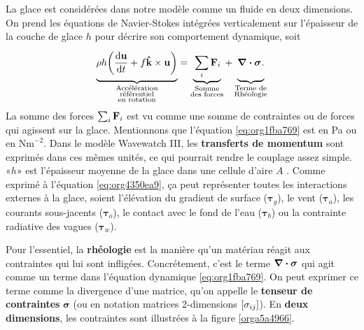 \documentclass[10pt]{article}
\numberwithin{equation}{section}
\newcommand{\kvf}{\vb{\hat{k}}}
\newcommand{\uu}{\vb{u}}
\newcommand{\venti}{\vphantom{\sum_x^x}}
\begin{document}
La glace est considérées dans notre modèle comme un fluide en deux dimensions.
On prend les équations de Navier-Stokes intégrées verticalement sur l'épaisseur de la couche de glace \(h\) pour décrire son comportement dynamique, soit
\begin{equation}
\label{eq:org1fba769}
    \underbrace{\venti\rho h\qty(\dv{\uu}{t} + f\kvf\times\uu)}_{\substack{\text{Accélération}\\\text{référentiel}\\\text{en rotation}}}
   =\underbrace{\venti\sum_i\vb{F}_i}_{\substack{\text{Somme}\\\text{des forces}}}
   +\underbrace{\venti\divergence{\boldsymbol{\sigma}}.}_{\substack{\text{Terme de}\\\text{Rhéologie}}}
\end{equation}
La somme des forces \(\sum_i \vb{F}_i\) est vu comme une somme de contraintes ou de forces qui agissent sur la glace.
Mentionnons que l'équation \ref{eq:org1fba769} est en Pa ou en \(\text{Nm}^{-2}\).
Dans le modèle Wavewatch III, les \textbf{transferts de momentum} sont exprimés dans ces mêmes unités, ce qui pourrait rendre le couplage assez simple.
«\(h\)» est l'épaisseur moyenne de la glace dans une cellule d'aire \(A\) \autocite[voir][pour un aperçu]{dumont2022marginal}. 
Comme exprimé à l'équation \ref{eq:org4350ea9}, ça peut représenter toutes les interactions externes à la glace, soient l'élévation du gradient de surface (\(\boldsymbol{\tau}_g\)), le vent (\(\boldsymbol{\tau}_a\)), les courants sous-jacents (\(\boldsymbol{\tau}_o\)), le contact avec le fond de l'eau (\(\boldsymbol{\tau}_b\)) ou la contrainte radiative des vagues (\(\boldsymbol{\tau}_w\)).\bigskip

Pour l'essentiel, la \textbf{rhéologie} est la manière qu'un matériau réagit aux contraintes qui lui sont infligées.
Concrétement, c'est le terme \(\divergence{\boldsymbol{\sigma}}\) qui agit comme un terme dans l'équation dynamique \ref{eq:org1fba769}. 
On peut exprimer ce terme comme la divergence d'une matrice, qu'on appelle le \textbf{tenseur de contraintes} \(\boldsymbol{\sigma}\) (ou en notation matrices 2-dimensions \(\qty[\sigma_{ij}]\)).
En \textbf{deux dimensions}, les contraintes sont illustrées à la figure \ref{orga5a4966}.\bigskip
\end{document}
